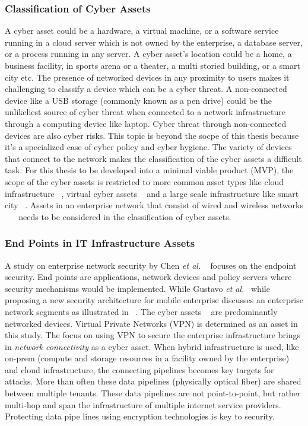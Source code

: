 \subsubsection{Classification of Cyber Assets}\label{sec:asset_class}
A cyber asset could be a hardware, a virtual machine, or a software service running in a cloud server which is not owned by the enterprise, a database server, or a process running in any server. A cyber asset's location could be a home, a business facility, in sports arena or a theater, a multi storied building, or a smart city etc. The presence of networked devices in any proximity to users makes it challenging to classify a device which can be a cyber threat. A non-connected device like a USB storage (commonly known as a pen drive) could be the unlikeliest source of cyber threat when connected to a network infrastructure through a computing device like laptop. Cyber threat through non-connected devices are also cyber risks. This topic is beyond the socpe of this thesis because it's a specialized case of cyber policy and cyber hygiene. The variety of devices that connect to the network makes the classification of the cyber assets a difficult task. For this thesis to be developed into a minimal viable product (MVP), the scope of the cyber assets is restricted to more common asset types like cloud infrastructure ~\cite{7145073}, virtual cyber assets ~\cite{4908498} and a large scale infrastructure like smart city ~\cite{7580812}. Assets in an enterprise network that consist of wired and wireless networks ~\cite{5375917} ~\cite{6222759} needs to be considered in the classification of cyber assets. \\

\subsubsection{End Points in IT Infrastructure Assets} \label{sec:ep_sec}
A study on enterprise network security by Chen \textit{et al.} ~\cite{5375916} focuses on the endpoint security. End points are applications, network devices and policy servers where security mechanisms would be implemented. While Gustavo \textit{et al.}~\cite{6222759} while proposing a new security architecture for mobile enterprise discusses an enterprise network segments as illustrated in ~\cite[Figure 1, 2]{6222759}. The cyber assets ~\cite{6222759} are predominantly networked devices. Virtual Private Networks (VPN) is determined as an asset in this study. The focus on using VPN to secure the enterprise infrastructure brings in  \textit{network connectivity} as a cyber asset. When hybrid infrastructure is used, like on-prem (compute and storage resources in a facility owned by the enterprise) and cloud infrastructure, the connecting pipelines becomes key targets for attacks. More than often these data pipelines (physically optical fiber) are shared between multiple tenants. These data pipelines are not point-to-point, but rather multi-hop and span the infrastructure of multiple internet service providers. Protecting data pipe lines using encryption technologies is key to security. \\


